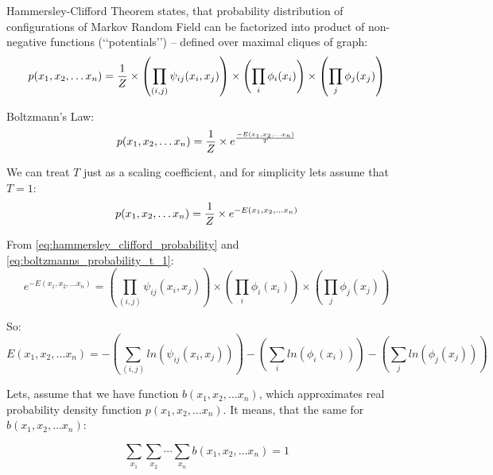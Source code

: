 \documentclass[fleqn,leqno]{article}
\begin{document}
Hammersley-Clifford Theorem \cite{hammersley_clifford_original, hammersley_clifford_proof, wikipedia_hammersley_clifford} states, that probability distribution of configurations of Markov Random Field can be factorized into product of non-negative functions (\lq \lq potentials\rq \rq) -- defined over maximal cliques of graph:
\begin{equation} \label{eq:hammersley_clifford_probability}
p(x_1, x_2, \dots x_n) = {1 \over Z} \times \left( \prod_{(i, j)} \psi_{ij}(x_i, x_j) \right) \times \left( \prod_{i} \phi_i(x_i) \right) \times \left( \prod_{j} \phi_j(x_j) \right)
\end{equation}

Boltzmann's Law:
\begin{equation*}
p(x_1, x_2, \dots x_n) = {1 \over Z} \times e^{{-E(x_1, x_2, \dots x_n) \over T}}
\end{equation*}

We can treat $T$ just as a scaling coefficient, and for simplicity lets assume that $T = 1$:
\begin{equation} \label{eq:boltzmanns_probability_t_1}
p(x_1, x_2, \dots x_n) = {1 \over Z} \times e^{-E(x_1, x_2, \dots x_n)}
\end{equation}

From \eqref{eq:hammersley_clifford_probability} and \eqref{eq:boltzmanns_probability_t_1}:
\begin{equation*}
e^{-E(x_1, x_2, \dots x_n)} = \left( \prod_{(i, j)} \psi_{ij}(x_i, x_j) \right) \times \left( \prod_{i} \phi_i(x_i) \right) \times \left( \prod_{j} \phi_j(x_j) \right)
\end{equation*}

So:
\begin{equation} \label{eq:energy_expression}
E(x_1, x_2, \dots x_n) = - \left( \sum_{(i, j)} ln(\psi_{ij}(x_i, x_j)) \right) - \left( \sum_{i} ln(\phi_i(x_i)) \right) - \left( \sum_{j} ln(\phi_j(x_j)) \right)
\end{equation}

Lets, assume that we have function $b(x_1, x_2, \dots x_n)$, which approximates real probability density function $p(x_1, x_2, \dots x_n)$.
It means, that  the same for $b(x_1, x_2, \dots x_n)$:

\begin{equation} \label{eq:probability_sum_b}
\sum_{x_1} \sum_{x_2} \cdots \sum_{x_n}  b(x_1, x_2, \dots x_n) = 1
\end{equation}
\end{document}
